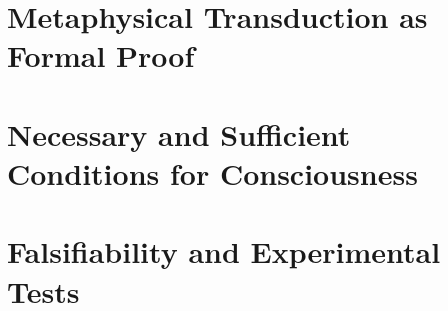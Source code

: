 \documentclass[runningheads]{llncs}
\begin{document}
\section{Metaphysical Transduction as Formal Proof}



\section{Necessary and Sufficient Conditions for Consciousness}


\section{Falsifiability and Experimental Tests}
\end{document}
